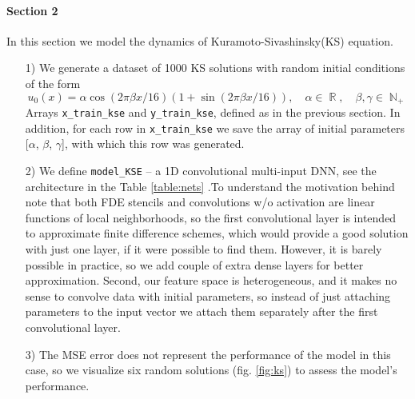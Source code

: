 \documentclass{article}
\DeclareMathOperator{\R}{\mathbb{R}}
\DeclareMathOperator{\N}{\mathbb{N}}
\begin{document}
\paragraph{Section 2} In this section we model the dynamics of Kuramoto-Sivashinsky(KS) equation.
    \begin{enumerate}
        \item[1)] We generate a dataset of 1000 KS solutions with random initial conditions of the form 
            \[
                u_0(x) = \alpha \cos(2\pi \beta x/16)(1+\sin(2\pi\beta x/16)), \quad \alpha \in \R, \quad \beta, \gamma \in \N_+
            \]
            Arrays \texttt{x\_train\_kse} and \texttt{y\_train\_kse}, defined as in the previous section. In addition, for each row in \texttt{x\_train\_kse} we save the array of initial parameters [$\alpha$, $\beta$, $\gamma$], with which this row was generated. 
        \item[2)] We define \texttt{model\_KSE} -- a 1D convolutional multi-input DNN, see the architecture in the Table \ref{table:nets} .To understand the motivation behind note that both FDE stencils and convolutions w/o activation are linear functions of local neighborhoods, so the first convolutional layer is intended to approximate finite difference schemes, which would provide a good solution with just one layer, if it were possible to find them. However, it is barely possible in practice, so we add couple of extra dense layers for better approximation. Second, our feature space is heterogeneous, and it makes no sense to convolve data with initial parameters, so instead of just attaching parameters to the input vector we attach them separately after the first convolutional layer. 
        \item[3)] The MSE error does not represent the performance of the model in this case, so we visualize six random solutions (fig. \ref{fig:ks}) to assess the model's performance. 
    \end{enumerate}
\end{document}
